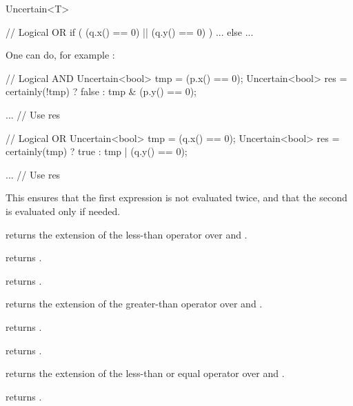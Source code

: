 \begin{ccRefClass}{Uncertain<T>}
\begin{ccExampleCode}
  // Logical OR
  if ( (q.x() == 0) || (q.y() == 0) )
    ...
  else
    ...
\end{ccExampleCode}

  One can do, for example :

\begin{ccExampleCode}
  // Logical AND
  Uncertain<bool> tmp = (p.x() == 0);
  Uncertain<bool> res = certainly(!tmp) ? false : tmp & (p.y() == 0);

  ... // Use res

  // Logical OR
  Uncertain<bool> tmp = (q.x() == 0);
  Uncertain<bool> res = certainly(tmp) ? true : tmp | (q.y() == 0);

  ... // Use res
\end{ccExampleCode}

  This ensures that the first expression is not evaluated twice, and that the second is
  evaluated only if needed.


  {returns the extension of the less-than operator over  and .}

  {returns .}

  {returns .}

  {returns the extension of the greater-than operator over  and .}

  {returns .}

  {returns .}

  {returns the extension of the less-than or equal operator over  and .}

  {returns .}


\end{ccRefClass}
